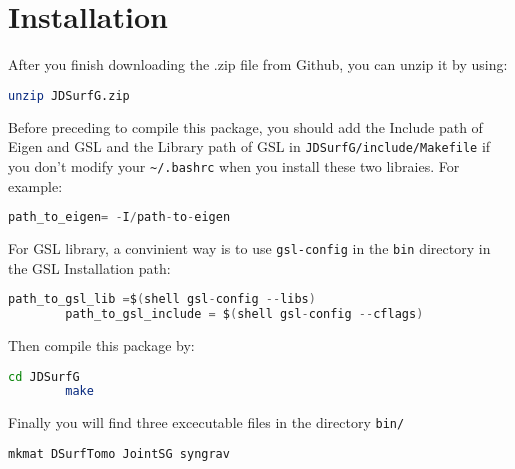 \documentclass[UTF8]{article}
\begin{document}
   \section{Installation}
   After you finish downloading the .zip file from Github, you can unzip it by using:
    \begin{lstlisting}[language=bash]
    unzip JDSurfG.zip
    \end{lstlisting}
   Before preceding to compile this package, you should add the Include path of Eigen and GSL 
   and the Library path of GSL in \verb!JDSurfG/include/Makefile! if you don't modify your 
   \verb!~/.bashrc! when you install these two libraies. For example:
   \begin{lstlisting}[language=c]
    path_to_eigen= -I/path-to-eigen
    \end{lstlisting}
    For GSL library, a convinient way is to use \verb!gsl-config! in the \verb!bin!
    directory in the GSL Installation path:
    \begin{lstlisting}[language=c]
        path_to_gsl_lib =$(shell gsl-config --libs)
        path_to_gsl_include = $(shell gsl-config --cflags)
    \end{lstlisting}

    Then compile this package by:
    \begin{lstlisting}[language=bash]
        cd JDSurfG
        make
    \end{lstlisting}
    Finally you will find three excecutable files in the directory \verb!bin/!
    \begin{lstlisting}[language=bash]
        mkmat DSurfTomo JointSG syngrav  
     \end{lstlisting}
    
\end{document}
